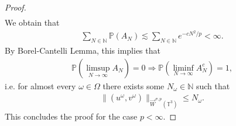\documentclass[a4paper, reqno, 11pt]{amsart}
\theoremstyle{definition}
\begin{document}
\begin{proof}
\begin{align*}
\end{align*}
We obtain that
\begin{align*}
\sum_{N \in \mathbb{N}} \mathbb{P}(A_N) \lesssim \sum_{N \in \mathbb{N}} e^{-cN^2/p} < \infty.
\end{align*}
By Borel-Cantelli Lemma, this implies that 
\begin{align*}
\mathbb{P}(\limsup_{N \rightarrow \infty} A_N) = 0 \Longrightarrow \mathbb{P}(\liminf_{N \rightarrow \infty} A_N^c) = 1,
\end{align*}
i.e. for almost every $\omega \in \Omega$ there exists some $N_{\omega} \in \mathbb{N}$ such that
\begin{align*}
\| (u^{\omega},v^{\omega}) \|_{\vec{W}^{\sigma,p}(\mathbb{T}^3)} \leq N_{\omega}.
\end{align*}
This concludes the proof for the case $p < \infty$. 


\end{proof}
\end{document}
